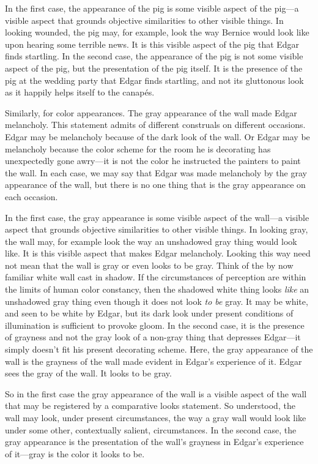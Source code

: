 \documentclass[12pt]{article}
\begin{document}
In the first case, the appearance of the pig is some visible aspect of the pig---a visible aspect that grounds objective similarities to other visible things. In looking wounded, the pig may, for example, look the way Bernice would look like upon hearing some terrible news. It is this visible aspect of the pig that Edgar finds startling. In the second case, the appearance of the pig is not some visible aspect of the pig, but the presentation of the pig itself. It is the presence of the pig at the wedding party that Edgar finds startling, and not its gluttonous look as it happily helps itself to the canapés.

Similarly, for color appearances. The gray appearance of the wall made Edgar melancholy. This statement admits of different construals on different occasions. Edgar may be melancholy because of the dark look of the wall. Or Edgar may be melancholy because the color scheme for the room he is decorating has unexpectedly gone awry---it is not the color he instructed the painters to paint the wall. In each case, we may say that Edgar was made melancholy by the gray appearance of the wall, but there is no one thing that is the gray appearance on each occasion.

In the first case, the gray appearance is some visible aspect of the wall---a visible aspect that grounds objective similarities to other visible things. In looking gray, the wall may, for example look the way an unshadowed gray thing would look like. It is this visible aspect that makes Edgar melancholy. Looking this way need not mean that the wall is gray or even looks to be gray. Think of the by now familiar white wall cast in shadow. If the circumstances of perception are within the limits of human color constancy, then the shadowed white thing looks \emph{like} an unshadowed gray thing even though it does not look \emph{to be} gray. It may be white, and seen to be white by Edgar, but its dark look under present conditions of illumination is sufficient to provoke gloom. In the second case, it is the presence of grayness and not the gray look of a non-gray thing that depresses Edgar---it simply doesn't fit his present decorating scheme. Here, the gray appearance of the wall is the grayness of the wall made evident in Edgar's experience of it. Edgar sees the gray of the wall. It looks to be gray.

So in the first case the gray appearance of the wall is a visible aspect of the wall that may be registered by a comparative looks statement. So understood, the wall may look, under present circumstances, the way a gray wall would look like under some other, contextually salient, circumstances. In the second case, the gray appearance is the presentation of the wall's grayness in Edgar's experience of it---gray is the color it looks to be.
\end{document}
